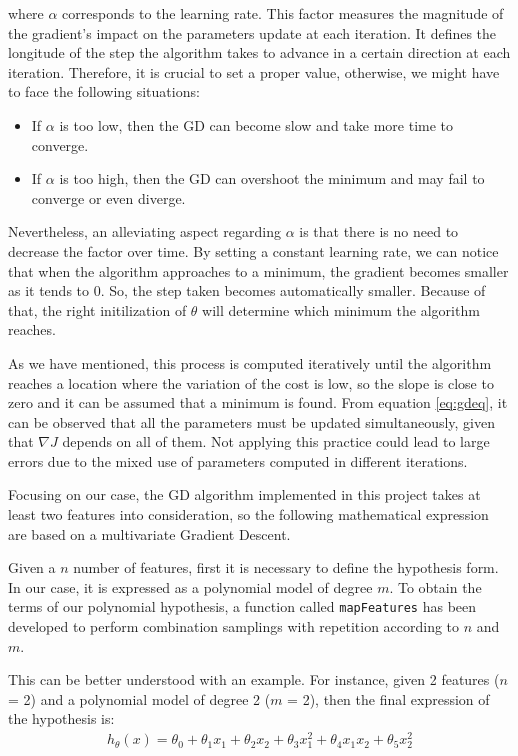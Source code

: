\documentclass[a4paper, report, oneside, UKenglish]{memoir}
\begin{document}
where $\alpha$ corresponds to the learning rate. This factor measures the magnitude of the gradient's impact on the parameters update at each iteration. It defines the longitude of the step the algorithm takes to advance in a certain direction at each iteration. Therefore, it is crucial to set a proper value, otherwise, we might have to face the following situations:
\begin{itemize}
    \item  If $\alpha$ is too low, then the GD can become slow and take more time to converge.
    \item  If $\alpha$ is too high, then the GD can overshoot the minimum and may fail to converge or even diverge.  
\end{itemize}

Nevertheless, an alleviating aspect regarding $\alpha$ is that there is no need to decrease the factor over time. By setting a constant learning rate, we can notice that when the algorithm approaches to a minimum, the gradient becomes smaller as it tends to 0. So, the step taken becomes automatically smaller. Because of that, the right initilization of $\theta$ will determine which minimum the algorithm reaches. 

As we have mentioned, this process is computed iteratively until the algorithm reaches a location where the variation of the cost is low, so the slope is close to zero and it can be assumed that a minimum is found. From equation \eqref{eq:gdeq}, it can be observed that all the parameters must be updated simultaneously, given that $\nabla J$ depends on all of them. Not applying this practice could lead to large errors due to the mixed use of parameters computed in different iterations. 

Focusing on our case, the GD algorithm implemented in this project takes at least two features into consideration, so the following mathematical expression are based on a multivariate Gradient Descent.  

Given a $n$ number of features, first it is necessary to define the hypothesis form. In our case, it is expressed as a polynomial model of degree $m$. To obtain the terms of our polynomial hypothesis, a function called \texttt{mapFeatures}  has been developed to perform combination samplings with repetition according to $n$ and $m$. 

This can be better understood with an example. For instance, given 2 features ($n$ = 2) and a polynomial model of degree 2 ($m$ = 2), then the final expression of the hypothesis is:
\begin{equation}\label{eq:gdH}
\begin{split}
    h_{\theta}(x) = \theta_{0} + \theta_{1}x_{1} + \theta_{2}x_{2} + \theta_{3}x^{2}_{1} + \theta_{4}x_{1}x_{2} + \theta_{5}x^{2}_{2}\\
\end{split}
\end{equation}
\end{document}
